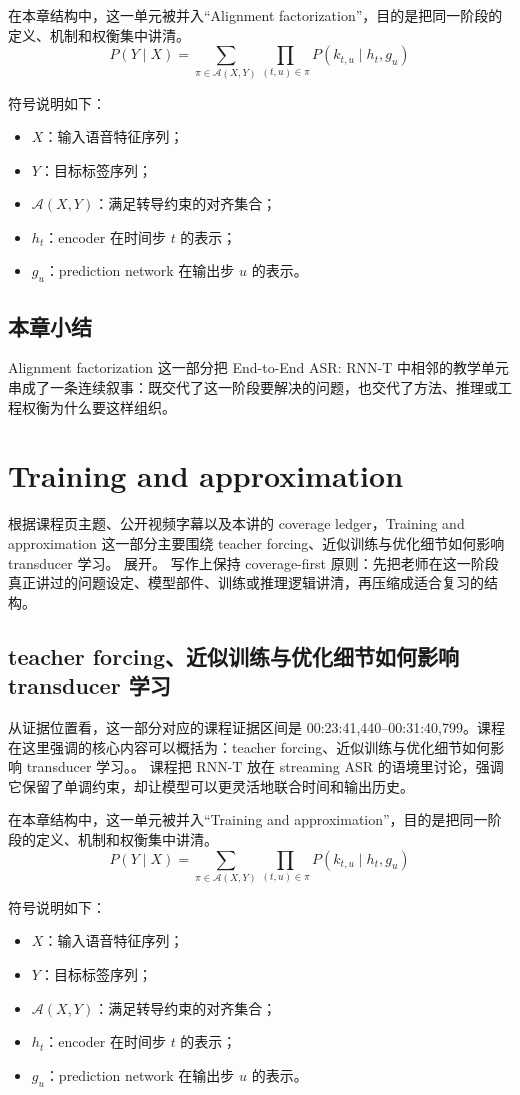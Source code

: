 \documentclass[a4paper]{article}
\begin{document}
在本章结构中，这一单元被并入“Alignment factorization”，目的是把同一阶段的定义、机制和权衡集中讲清。
\[
P(Y \mid X) = \sum_{\pi \in \mathcal{A}(X,Y)} \prod_{(t,u)\in\pi} P(k_{t,u} \mid h_t, g_u)
\]

符号说明如下：
\begin{itemize}
\item $X$：输入语音特征序列；
\item $Y$：目标标签序列；
\item $\mathcal{A}(X,Y)$：满足转导约束的对齐集合；
\item $h_t$：encoder 在时间步 $t$ 的表示；
\item $g_u$：prediction network 在输出步 $u$ 的表示。
\end{itemize}

\subsection{本章小结}
Alignment factorization 这一部分把 End-to-End ASR: RNN-T 中相邻的教学单元串成了一条连续叙事：既交代了这一阶段要解决的问题，也交代了方法、推理或工程权衡为什么要这样组织。

\section{Training and approximation}
根据课程页主题、公开视频字幕以及本讲的 coverage ledger，Training and approximation 这一部分主要围绕 teacher forcing、近似训练与优化细节如何影响 transducer 学习。 展开。
写作上保持 coverage-first 原则：先把老师在这一阶段真正讲过的问题设定、模型部件、训练或推理逻辑讲清，再压缩成适合复习的结构。

\subsection{teacher forcing、近似训练与优化细节如何影响 transducer 学习}
从证据位置看，这一部分对应的课程证据区间是 00:23:41,440--00:31:40,799。课程在这里强调的核心内容可以概括为：teacher forcing、近似训练与优化细节如何影响 transducer 学习。。
课程把 RNN-T 放在 streaming ASR 的语境里讨论，强调它保留了单调约束，却让模型可以更灵活地联合时间和输出历史。

在本章结构中，这一单元被并入“Training and approximation”，目的是把同一阶段的定义、机制和权衡集中讲清。
\[
P(Y \mid X) = \sum_{\pi \in \mathcal{A}(X,Y)} \prod_{(t,u)\in\pi} P(k_{t,u} \mid h_t, g_u)
\]

符号说明如下：
\begin{itemize}
\item $X$：输入语音特征序列；
\item $Y$：目标标签序列；
\item $\mathcal{A}(X,Y)$：满足转导约束的对齐集合；
\item $h_t$：encoder 在时间步 $t$ 的表示；
\item $g_u$：prediction network 在输出步 $u$ 的表示。
\end{itemize}
\end{document}
